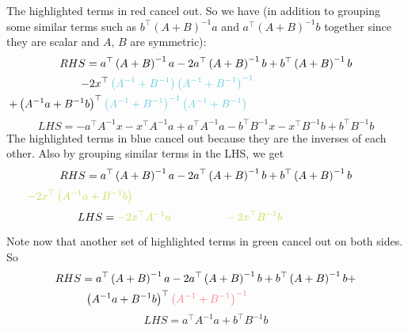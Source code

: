 \documentclass[11pt]{report} %
\begin{document}
The highlighted terms in \red red \black cancel out. So we have (in addition to grouping some similar terms such as $b^{\top}\left(A+B\right)^{-1}a$ and $a^{\top}\left(A+B\right)^{-1}b$ together since they are scalar and $A$, $B$ are symmetric):
\begin{multline}
RHS=a^{\top}\left(A+B\right)^{-1}a-2a^{\top}\left(A+B\right)^{-1}b+b^{\top}\left(A+B\right)^{-1}b \\
-2x^{\top}\blue\left(A^{-1}+B^{-1}\right)\left(A^{-1}+B^{-1}\right)^{-1}\black \left(A^{-1}a+B^{-1}b\right) \\
+\left(A^{-1}a+B^{-1}b\right)^{\top}\blue\left(A^{-1}+B^{-1}\right)^{-1}\left(A^{-1}+B^{-1}\right)\black \left(A^{-1}+B^{-1}\right)^{-1}\left(A^{-1}a+B^{-1}b\right)
\end{multline}
\begin{equation}
LHS=-a^{\top}A^{-1}x-x^{\top}A^{-1}a+a^{\top}A^{-1}a-b^{\top}B^{-1}x-x^{\top}B^{-1}b+b^{\top}B^{-1}b
\end{equation}
The highlighted terms in \blue blue \black cancel out because they are the inverses of each other. Also by grouping similar terms in the LHS, we get
\begin{multline}
RHS=a^{\top}\left(A+B\right)^{-1}a-2a^{\top}\left(A+B\right)^{-1}b+b^{\top}\left(A+B\right)^{-1}b \\
\green -2x^{\top}\left(A^{-1}a+B^{-1}b\right)\black +\left(A^{-1}a+B^{-1}b\right)^{\top}\left(A^{-1}+B^{-1}\right)^{-1}\left(A^{-1}a+B^{-1}b\right)
\end{multline}
\begin{equation}
LHS=\green -2x^{\top}A^{-1}a\black +a^{\top}A^{-1}a \green -2x^{\top}B^{-1}b\black +b^{\top}B^{-1}b
\end{equation}

Note now that another set of highlighted terms in \green green \black cancel out on both sides. So
\begin{multline}
RHS=a^{\top}\left(A+B\right)^{-1}a-2a^{\top}\left(A+B\right)^{-1}b+b^{\top}\left(A+B\right)^{-1}b+ \\
\left(A^{-1}a+B^{-1}b\right)^{\top}\red\left(A^{-1}+B^{-1}\right)^{-1}\black\left(A^{-1}a+B^{-1}b\right)
\end{multline}
\begin{equation}
LHS=a^{\top}A^{-1}a+b^{\top}B^{-1}b
\end{equation}
\end{document}
